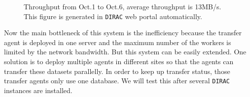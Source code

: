 \begin{figure}[h]
\begin{minipage}{.49\textwidth}
\caption{\label{fig:throughput}Throughput from Oct.1 to Oct.6, 
average throughput is 13MB/s. This figure is generated in 
{\tt DIRAC} web portal automatically.}
\end{minipage}
\end{figure}

Now the main bottleneck of this system is the inefficiency because 
the transfer agent is deployed in one server and the maximum number of 
the workers is limited by the network bandwidth.
But this system can be easily extended.
One solution is to deploy multiple agents in different sites
so that the agents can transfer these datasets parallelly.
In order to keep up transfer status,
those transfer agents only use one database.
We will test this after several {\tt DIRAC} instances are installed.
